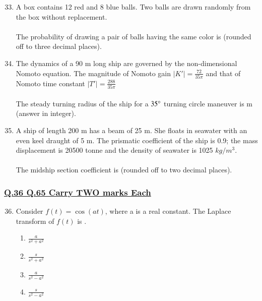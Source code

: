 \documentclass[journal]{IEEEtran}
\theoremstyle{remark}
\begin{document}
\begin{enumerate}[itemsep=1em]
\setcounter{enumi}{32}
\item A box contains 12 red and 8 blue balls. Two balls are drawn randomly from the box without replacement.\\
\\
The probability of drawing a pair of balls having the same color is \underline{\hspace{2cm}} (rounded off to three decimal places).
\end{enumerate}

\begin{enumerate}[itemsep=1em]
\setcounter{enumi}{33}
\item The dynamics of a 90 m long ship are governed by the non-dimensional Nomoto equation. The magnitude of Nomoto gain $|K'|=\frac{72}{35\pi}$ and that of Nomoto time constant $|T'|=\frac{288}{35\pi}$  \\
\\
The steady turning radius of the ship for a $35\degree$ turning circle maneuver is \underline{\hspace{2cm}} m (answer in integer). 
\end{enumerate}

\begin{enumerate}[itemsep=1em]
\setcounter{enumi}{34}
\item A ship of length 200 m has a beam of 25 m. She floats in seawater with an even keel draught of 5 m. The prismatic coefficient of the ship is 0.9; the mass displacement is 20500 tonne and the density of seawater is 1025 $kg/m^3$.\\
\\
The midship section coefficient is \underline{\hspace{2cm}} (rounded off to two decimal places). 
\end{enumerate}

\subsubsection{\underline{Q.36 \text{-} Q.65 Carry TWO marks Each}}
\setlength{\parskip}{1em}

\begin{enumerate}[itemsep=1em]
\setcounter{enumi}{35}
\item 
Consider $f(t)=\cos(at)$, where a is a real constant. The Laplace transform of $f(t)$ is \underline{\hspace{2cm}}.  
\begin{multicols}{4}
\begin{enumerate}
    \item $\frac{a}{s^2+a^2}$
    \item $\frac{s}{s^2+a^2}$
    \item $\frac{a}{s^2-a^2}$
    \item $\frac{s}{s^2-a^2}$
\end{enumerate}
\end{multicols}
\end{enumerate}
\end{document}
